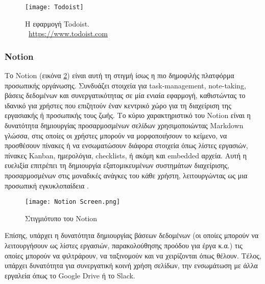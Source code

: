                 \begin{figure}[h!] \noindent \centering
                    \texttt{[image: Todoist]}
                    \caption{Η εφαρμογή Todoist. \\ {\footnotesize \textcopyright\ \url{https://www.todoist.com}}}
                    \label{fig:Todoist}
                \end{figure}


            \subsubsection{Notion}
                Το Notion (εικόνα \ref{fig:Notion}) είναι αυτή τη στιγμή ίσως η πιο δημοφιλής πλατφόρμα προσωπικής οργάνωσης. Συνδυάζει στοιχεία για task-management, note-taking, βάσεις δεδομένων και συνεργατικότητας σε μία ενιαία εφαρμογή, καθιστώντας το ιδανικό για χρήστες που επιζητούν έναν κεντρικό χώρο για τη διαχείριση της εργασιακής ή προσωπικής τους ζωής. Το κύριο χαρακτηριστικό του Notion είναι η δυνατότητα δημιουργίας προσαρμοσμένων σελίδων χρησιμοποιώντας Markdown γλώσσα, στις οποίες οι χρήστες μπορούν να μορφοποιήσουν το κείμενο, να προσθέσουν πίνακες ή να ενσωματώσουν διάφορα στοιχεία όπως λίστες εργασιών, πίνακες Kanban, ημερολόγια, checklists, ή ακόμη και embedded αρχεία. Αυτή η ευελιξία επιτρέπει τη δημιουργία εξατομικευμένων συστημάτων διαχείρισης, προσαρμοσμένων στις μοναδικές ανάγκες του κάθε χρήστη, λειτουργώντας ως μια προσωπική εγκυκλοπαίδεια \cite{Notion}.

                \begin{figure}[h!] \noindent \centering
                    \texttt{[image: Notion Screen.png]}
                    \caption{\centering Στιγμιότυπο του Notion \cite{klubzeroNotionProductivity}}
                    \label{fig:Notion}
                \end{figure}

                Επίσης, υπάρχει η δυνατότητα δημιουργίας βάσεων δεδομένων (οι οποίες μπορούν να λειτουργήσουν ως λίστες εργασιών, παρακολούθησης προόδου για έργα κ.α.) τις οποίες μπορούν να φιλτράρουν, να ταξινομούν και να χειρίζονται όπως θέλουν. Τέλος, υπάρχει δυνατότητα για συνεργατική κοινή χρήση σελίδων, την ενσωμάτωση με άλλα εργαλεία όπως το Google Drive ή το Slack.

